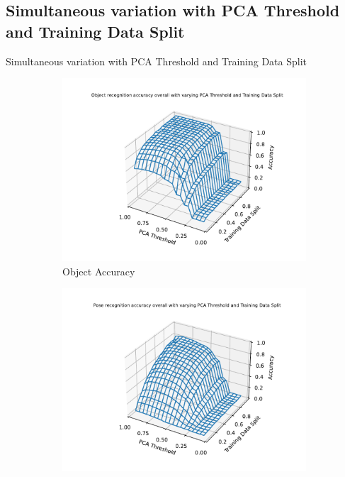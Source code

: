 \documentclass[aspectratio=169, handout, 10pt, hyperref=colorlinks]{beamer}
\begin{document}
\subsection{Simultaneous variation with PCA Threshold and Training Data Split}
\begin{frame}{Simultaneous variation with PCA Threshold and Training Data Split}
    \begin{figure}
        \centering
        \begin{subfigure}{0.32\linewidth}
            \centering
            \includegraphics[width=\linewidth]{combined/object_accuracy_overall.pdf}
            \caption{Object Accuracy}
        \end{subfigure}
        \begin{subfigure}{0.32\linewidth}
            \centering
            \includegraphics[width=\linewidth]{combined/pose_accuracy_overall.pdf}

\end{subfigure}
\end{figure}
\end{frame}
\end{document}

